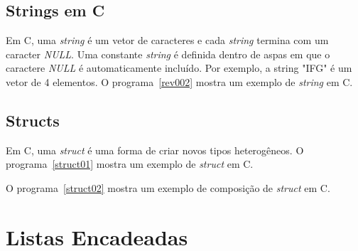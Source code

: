 \documentclass[11pt,fleqn]{book} %
\begin{document}
\label{rev001}

\label{rev003}

\subsection*{Strings em C}
Em C, uma \textit{string} é um vetor de caracteres e cada \textit{string} termina com um caracter \textit{NULL}.
Uma constante \textit{string} é definida dentro de aspas em que o caractere \textit{NULL} é automaticamente incluído.
Por exemplo, a string "IFG" é um vetor de 4 elementos.
O programa~\ref{rev002} mostra um exemplo de \textit{string} em C. 
\label{rev002}


\subsection*{Structs}
Em C, uma \textit{struct} é uma forma de criar novos tipos heterogêneos.
O programa~\ref{struct01} mostra um exemplo de \textit{struct} em C. 

\newpage
\label{struct01}

\newpage
O programa~\ref{struct02} mostra um exemplo de composição de \textit{struct} em C. 
\label{struct02}

\section{Listas Encadeadas}
\end{document}
